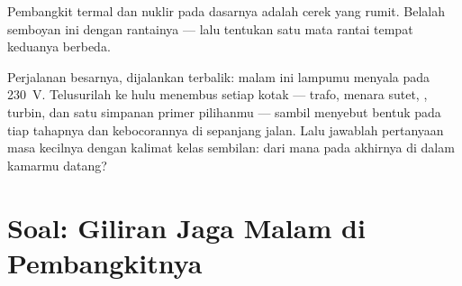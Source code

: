 \begin{exercise}[$\star\star$]\label{exo:g9:alternator:11}
Pembangkit termal dan nuklir pada dasarnya adalah cerek yang rumit.
Belalah semboyan ini dengan rantainya --- lalu tentukan satu mata
rantai tempat keduanya berbeda.
\end{exercise}

\begin{exercise}[$\star\star\star$]\label{exo:g9:alternator:12}
Perjalanan besarnya, dijalankan terbalik: malam ini lampumu menyala
pada \qty{230}{V}. Telusurilah  ke hulu menembus setiap kotak
--- trafo, menara sutet, , turbin, dan satu simpanan primer
pilihanmu --- sambil menyebut bentuk  pada tiap tahapnya dan
kebocorannya di sepanjang jalan. Lalu jawablah pertanyaan masa
kecilnya dengan kalimat kelas sembilan: dari mana pada akhirnya 
di dalam kamarmu datang?
\end{exercise}

\section{Soal: Giliran Jaga Malam di Pembangkitnya}

